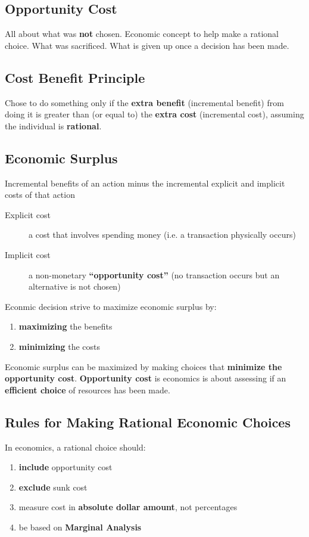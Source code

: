 \subsection{Opportunity Cost}
All about what was \textbf{not} chosen. Economic concept to help make a rational choice. What was sacrificed. What is given up once a decision has been made.

\subsection{Cost Benefit Principle}
Chose to do something only if the \textbf{extra benefit} (incremental benefit) from doing it is greater than (or equal to) the \textbf{extra cost} (incremental cost), assuming the individual is \textbf{rational}.

\subsection{Economic Surplus}
Incremental benefits of an action minus the incremental explicit and implicit costs of that action
\begin{description}
	\item[Explicit cost] a cost that involves spending money (i.e. a transaction physically occurs)
	\item[Implicit cost] a non-monetary \textbf{``opportunity cost''} (no transaction occurs but an alternative is not chosen)
\end{description}
Econmic decision strive to maximize economic surplus by:
\begin{enumerate}
	\item \textbf{maximizing} the benefits
	\item \textbf{minimizing} the costs
\end{enumerate}
Economic surplus can be maximized by making choices that \textbf{minimize the opportunity cost}. \textbf{Opportunity cost} is economics is about assessing if an \textbf{efficient choice} of resources has been made.

\subsection{Rules for Making Rational Economic Choices}
In economics, a rational choice should:
\begin{enumerate}
	\item \textbf{include} opportunity cost
	\item \textbf{exclude} sunk cost
	\item measure cost in \textbf{absolute dollar amount}, not percentages
	\item be based on \textbf{Marginal Analysis}
\end{enumerate}

